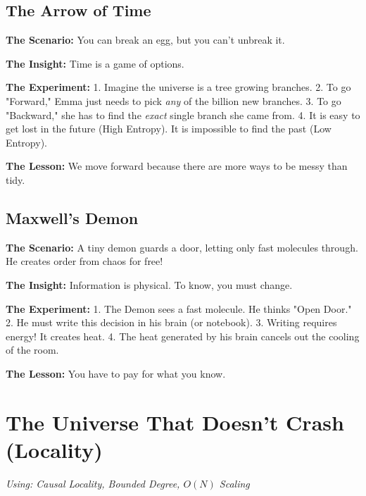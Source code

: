 \documentclass[11pt, a4paper, openany]{book}
\begin{document}
\section{The Arrow of Time}
\begin{thoughtexp}
\textbf{The Scenario:} You can break an egg, but you can't unbreak it.

\textbf{The Insight:} Time is a game of options.

\textbf{The Experiment:}
1. Imagine the universe is a tree growing branches.
2. To go "Forward," Emma just needs to pick \emph{any} of the billion new branches.
3. To go "Backward," she has to find the \emph{exact} single branch she came from.
4. It is easy to get lost in the future (High Entropy). It is impossible to find the past (Low Entropy).

\textbf{The Lesson:} We move forward because there are more ways to be messy than tidy.
\end{thoughtexp}

\section{Maxwell's Demon}
\begin{thoughtexp}
\textbf{The Scenario:} A tiny demon guards a door, letting only fast molecules through. He creates order from chaos for free!

\textbf{The Insight:} Information is physical. To know, you must change.

\textbf{The Experiment:}
1. The Demon sees a fast molecule. He thinks "Open Door."
2. He must write this decision in his brain (or notebook).
3. Writing requires energy! It creates heat.
4. The heat generated by his brain cancels out the cooling of the room.

\textbf{The Lesson:} You have to pay for what you know.
\end{thoughtexp}

\chapter{The Universe That Doesn't Crash (Locality)}
\textit{Using: Causal Locality, Bounded Degree, $O(N)$ Scaling}
\end{document}
